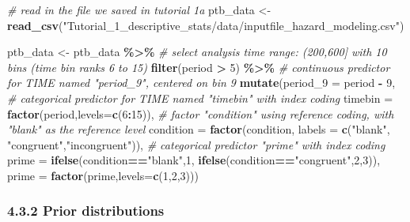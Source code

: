 \documentclass[
  man, donotrepeattitle,floatsintext]{apa6}
\newenvironment{Shaded}{\begin{snugshade}}{\end{snugshade}}
\newcommand{\AttributeTok}[1]{\textcolor[rgb]{0.13,0.29,0.53}{#1}}
\newcommand{\CommentTok}[1]{\textcolor[rgb]{0.56,0.35,0.01}{\textit{#1}}}
\newcommand{\DecValTok}[1]{\textcolor[rgb]{0.00,0.00,0.81}{#1}}
\newcommand{\FunctionTok}[1]{\textcolor[rgb]{0.13,0.29,0.53}{\textbf{#1}}}
\newcommand{\NormalTok}[1]{#1}
\newcommand{\OtherTok}[1]{\textcolor[rgb]{0.56,0.35,0.01}{#1}}
\newcommand{\SpecialCharTok}[1]{\textcolor[rgb]{0.81,0.36,0.00}{\textbf{#1}}}
\newcommand{\StringTok}[1]{\textcolor[rgb]{0.31,0.60,0.02}{#1}}
\begin{document}
\scriptsize

\begin{Shaded}
\begin{Highlighting}[]
\CommentTok{\# read in the file we saved in tutorial 1a}
\NormalTok{ptb\_data }\OtherTok{\textless{}{-}} \FunctionTok{read\_csv}\NormalTok{(}\StringTok{"Tutorial\_1\_descriptive\_stats/data/inputfile\_hazard\_modeling.csv"}\NormalTok{)}

\NormalTok{ptb\_data }\OtherTok{\textless{}{-}}\NormalTok{ ptb\_data }\SpecialCharTok{\%\textgreater{}\%} 
\CommentTok{\# select analysis time range: (200,600] with 10 bins (time bin ranks 6 to 15)}
\FunctionTok{filter}\NormalTok{(period }\SpecialCharTok{\textgreater{}} \DecValTok{5}\NormalTok{) }\SpecialCharTok{\%\textgreater{}\%}
       \CommentTok{\# continuous predictor for TIME named "period\_9", centered on bin 9}
\FunctionTok{mutate}\NormalTok{(}\AttributeTok{period\_9 =}\NormalTok{ period }\SpecialCharTok{{-}} \DecValTok{9}\NormalTok{,}
       \CommentTok{\# categorical predictor for TIME named "timebin" with index coding}
       \AttributeTok{timebin =} \FunctionTok{factor}\NormalTok{(period,}\AttributeTok{levels=}\FunctionTok{c}\NormalTok{(}\DecValTok{6}\SpecialCharTok{:}\DecValTok{15}\NormalTok{)),}
       \CommentTok{\# factor "condition" using reference coding, with "blank" as the reference level}
       \AttributeTok{condition =} \FunctionTok{factor}\NormalTok{(condition, }\AttributeTok{labels =} \FunctionTok{c}\NormalTok{(}\StringTok{"blank"}\NormalTok{, }\StringTok{"congruent"}\NormalTok{,}\StringTok{"incongruent"}\NormalTok{)),}
       \CommentTok{\# categorical predictor "prime" with index coding}
       \AttributeTok{prime =} \FunctionTok{ifelse}\NormalTok{(condition}\SpecialCharTok{==}\StringTok{"blank"}\NormalTok{,}\DecValTok{1}\NormalTok{, }\FunctionTok{ifelse}\NormalTok{(condition}\SpecialCharTok{==}\StringTok{"congruent"}\NormalTok{,}\DecValTok{2}\NormalTok{,}\DecValTok{3}\NormalTok{)),}
       \AttributeTok{prime =} \FunctionTok{factor}\NormalTok{(prime,}\AttributeTok{levels=}\FunctionTok{c}\NormalTok{(}\DecValTok{1}\NormalTok{,}\DecValTok{2}\NormalTok{,}\DecValTok{3}\NormalTok{)))}
\end{Highlighting}
\end{Shaded}

\normalsize

\subsubsection{4.3.2 Prior distributions}\label{prior-distributions}
\end{document}
